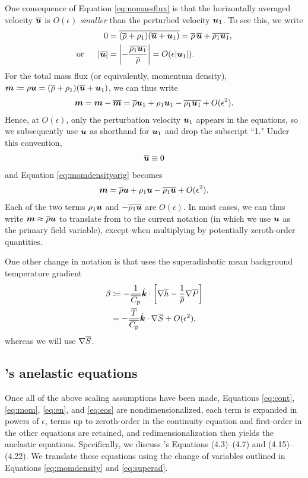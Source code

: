 \documentclass[12pt]{article}
\newcommand{\veck}{\hat{\bm{k}}}
\newcommand{\uover}{\overline{\vecu}}
\begin{document}
	One consequence of Equation \eqref{eq:nomassflux} is that the horizontally averaged velocity $\overline{\bm{u}}$ is $O(\epsilon)$ \textit{smaller} than the perturbed velocity $\bm{u}_1$. To see this, we write
	\begin{align}
		0 &= \overline{(\rhoover+\rhoone)(\overline{\vecu}+\vecu_1)} = \rhoover\,\uover + \overline{\rhoone\vecu_1},\nonumber\\
		\orr |\uover| &= \left|-\frac{\overline{\rhoone\vecu_1}}{\rhoover}\right| = O(\epsilon|\vecu_1|).
	\end{align}
	For the total mass flux (or equivalently, momentum density), $\bm{m}\coloneqq \rho\bm{u}=(\overline{\rho}+\rho_1)(\overline{\bm{u}}+\bm{u}_1)$, we can thus write
		\begin{align}\label{eq:momdensityorig}
		\bm{m} = \bm{m}-\overline{\bm{m}}=\overline{\rho}\bm{u}_1 + \rho_1\bm{u}_1 - \overline{\rho_1\bm{u}_1} + O(\epsilon^2).
	\end{align}
	Hence, at $O(\epsilon)$, only the perturbation velocity $\bm{u}_1$ appears in the equations, so we subsequently use $\bm{u}$ as shorthand for $\bm{u}_1$ and drop the subscript ``1." Under this convention,
\begin{align}\label{eq:nomeanu}
	\overline{\bm{u}}\equiv0
\end{align}
	and Equation \eqref{eq:momdensityorig} becomes
	\begin{align}\label{eq:momdensity}
		\bm{m} = \overline{\rho}\bm{u} + \rho_1\bm{u} - \overline{\rho_1\bm{u}} + O(\epsilon^2).
	\end{align}
	Each of the two terms $\rho_1\bm{u}$ and $-\overline{\rho_1\bm{u}}$ are $O(\epsilon)$. In most cases, we can thus write $\bm{m} \approx \overline{\rho} \bm{u}$ to translate from \citet{Gough1969} to the current notation (in which we use $\bm{u}$ as the primary field variable), except when multiplying by potentially zeroth-order quantities.
	
	 One other change in notation is that \citet{Gough1969} uses the superadiabatic mean background temperature gradient
	\begin{align}\label{eq:superad}
		\beta &\define -\frac{1}{\cpover}\veck\cdot\left[\nabla\overline{h}-\frac{1}{\rhoover}\nabla\prsover\right]\nonumber\\
		&=-\frac{\tmpover}{\cpover}\veck\dotgrad\entrover + O(\epsilon^2),
	\end{align}
	whereas we will use $\nabla \overline{S}$. 
	
	\subsection{\citet{Gough1969}'s anelastic equations}
	Once all of the above scaling assumptions have been made, Equations \eqref{eq:cont}, \eqref{eq:mom}, \eqref{eq:en}, and \eqref{eq:eos} are nondimensionalized, each term is expanded in powers of $\epsilon$, terms up to zeroth-order in the continuity equation and first-order in the other equations are retained, and redimensionalization then yields the anelastic equations. Specifically, we discuss \citet{Gough1969}'s Equations (4.3)--(4.7) and (4.15)--(4.22). We translate these equations using the change of variables outlined in Equations \eqref{eq:momdensity} and \eqref{eq:superad}. 
	
\end{document}
